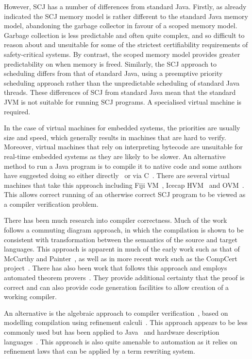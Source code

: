 \documentclass[a4paper,10pt]{report}
\begin{document}
However, SCJ has a number of differences from standard Java.
Firstly, as already indicated the SCJ memory model is rather different
to the standard Java memory model, abandoning the garbage collector in
favour of a scoped memory model.
Garbage collection is less predictable and often quite complex, and so
difficult to reason about and unsuitable for some of the strictest
certifiability requirements of safety-critical systems.
By contrast, the scoped memory model provides greater predictability
on when memory is freed.
Similarly, the SCJ approach to scheduling differs from that of
standard Java, using a preemptive priority scheduling approach rather
than the unpredictable scheduling of standard Java threads.
These differences of SCJ from standard Java mean that the standard JVM
is not suitable for running SCJ programs.
A specialised virtual machine is required.

In the case of virtual machines for embedded systems, the priorities
are usually size and speed, which generally results in machines that
are hard to verify.
Moreover, virtual machines that rely on interpreting bytecode are
unsuitable for real-time embedded systems as they are likely to be
slower.
An alternative method to run a Java program is to compile it to native
code and some authors have suggested doing so either
directly~\cite{schultz2003} or via C~\cite{varma2004}.
There are several virtual machines that take this approach including
Fiji VM~\cite{pizlo2009}, Icecap HVM~\cite{sondergaard2012} and
OVM~\cite{armbruster2007}.
This allows correct running of an otherwise correct SCJ program to be
viewed as a compiler verification problem.

There has been much research into compiler correctness.
Much of the work follows a commuting diagram approach, in which the
compilation is shown to be consistent with transformation between the
semantics of the source and target languages\cite{morris1973,
  thatcher1979}.
This approach is apparent in much of the early work such as that of
McCarthy and Painter~\cite{mccarthy1967}, as well as in more recent
work such as the CompCert project~\cite{leroy2009a, leroy2009b}.
There has also been work that follows this approach and employs
automated theorem provers~\cite{klein2006, milner1972, nipkow2000}.
They provide additional certainty that the proof is correct and can
also provide code generation facilities to allow creation of a working
compiler.

An alternative is the algebraic approach to compiler
verification~\cite{hoare1991, sampaio1993}, based on modelling
compilation using refinement calculi~\cite{back1981, morgan1990,
  morris1987}.
This approach appears to be less commonly used but has been applied to
Java~\cite{duran2005, duran2010} and hardware description
languages~\cite{perna2010, perna2011}.
This approach is also quite amenable to automation as it relies on
refinement laws that can be applied by a term rewriting system.
\end{document}
